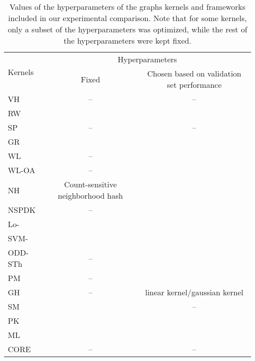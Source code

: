 \documentclass[twoside,11pt]{article}
\begin{document}
\begin{table}[t]
\centering
\scriptsize
\def\arraystretch{1.2}
\begin{tabular}{|l|c|c|} \hline
\multirow{2}{*}{Kernels} & \multicolumn{2}{c|}{Hyperparameters} \\ \cline{2-3} 
                         & Fixed          & Chosen based on validation set performance          \\ \hline
VH                       &   --                & --                 \\ \hline
RW                      &                 &                 \\ \hline
SP                       &--                   &--                  \\ \hline
GR                       &                   &                  \\ \hline
WL                       &  --                 &                  \\ \hline
WL-OA                    &  --                 &                  \\ \hline
NH                       &Count-sensitive neighborhood hash             &                  \\ \hline
NSPDK                    &--                   &                 \\ \hline
Lo-      &                &               \\ \hline
SVM-  &  &                  \\ \hline
ODD-STh                  &--                   &                 \\ \hline
PM                       &--                   &                  \\ \hline
GH                       &--                   &linear kernel/gaussian kernel                 \\ \hline
SM                       &                   &    --              \\ \hline
PK                      &                   &                 \\ \hline
ML                       &                &                  \\ \hline
CORE                     &  --                 & --                \\ \hline
\end{tabular}
\caption{Values of the hyperparameters of the graphs kernels and frameworks included in our experimental comparison. Note that for some kernels, only a subset of the hyperparameters was optimized, while the rest of the hyperparameters were kept fixed.}
\label{tab:kernel_parametrization}
\end{table}
\end{document}
